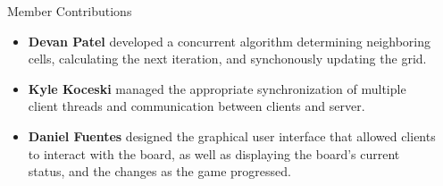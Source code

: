 \documentclass[final]{beamer}
\newlength{\onecolwid}
\newlength{\twocolwid}
\begin{document}
\begin{frame}[t]
\begin{columns}[t]
\begin{column}{\twocolwid}
\begin{columns}[t,totalwidth=\twocolwid] %

\begin{column}{\onecolwid}\vspace{-.6in} %


\begin{block}{Member Contributions}

\begin{itemize}
\item \textbf{Devan Patel} developed a concurrent algorithm determining neighboring cells, calculating the next iteration, and synchonously updating the grid.
\item\textbf{Kyle Koceski} managed the appropriate synchronization of multiple client threads and communication between clients and server.
\item\textbf{Daniel Fuentes} designed the graphical user interface that allowed clients to interact with the board, as well as displaying the board's current status, and the changes as the game progressed.
\end{itemize}
\end{block}


\end{column} %

\begin{column}{\onecolwid}\vspace{-.6in} %



\end{column}
\end{columns}
\end{column}
\end{columns}
\end{frame}
\end{document}
